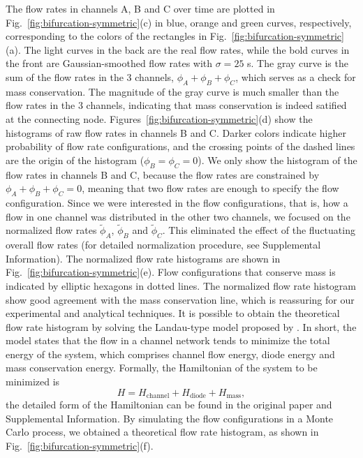 \documentclass[%
10pt,
superscriptaddress,
twocolumn,
 amsmath,amssymb,
 aps,prx,
]{revtex4-2}
\begin{document}
The flow rates in channels A, B and C over time are plotted in Fig.~\ref{fig:bifurcation-symmetric}(c) in blue, orange and green curves, respectively, corresponding to the colors of the rectangles in Fig.~\ref{fig:bifurcation-symmetric}(a).
The light curves in the back are the real flow rates, while the bold curves in the front are Gaussian-smoothed flow rates with $\sigma=25$ s.
The gray curve is the sum of the flow rates in the 3 channels, $\phi_A+\phi_B+\phi_C$, which serves as a check for mass conservation.
The magnitude of the gray curve is much smaller than the flow rates in the 3 channels, indicating that mass conservation is indeed satified at the connecting node.
Figures~\ref{fig:bifurcation-symmetric}(d) show the histograms of raw flow rates in channels B and C.
Darker colors indicate higher probability of flow rate configurations, and the crossing points of the dashed lines are the origin of the histogram ($\phi_B=\phi_C=0$).
We only show the histogram of the flow rates in channels B and C, because the flow rates are constrained by $\phi_A+\phi_B+\phi_C=0$, meaning that two flow rates are enough to specify the flow configuration.
Since we were interested in the flow configurations, that is, how a flow in one channel was distributed in the other two channels, we focused on the normalized flow rates $\tilde\phi_A$, $\tilde\phi_B$ and $\tilde\phi_C$.
This eliminated the effect of the fluctuating overall flow rates (for detailed normalization procedure, see Supplemental Information).
The normalized flow rate histograms are shown in Fig.~\ref{fig:bifurcation-symmetric}(e).
Flow configurations that conserve mass is indicated by elliptic hexagons in dotted lines.
The normalized flow rate histogram show good agreement with the mass conservation line, which is reassuring for our experimental and analytical techniques.
It is possible to obtain the theoretical flow rate histogram by solving the Landau-type model proposed by \citet{Woodhouse2017}.
In short, the model states that the flow in a channel network tends to minimize the total energy of the system, which comprises channel flow energy, diode energy and mass conservation energy.
Formally, the Hamiltonian of the system to be minimized is
%
\begin{equation}
    H = H_{\mathrm{channel}} + H_{\mathrm{diode}} + H_{\mathrm{mass}},
\end{equation}
%
the detailed form of the Hamiltonian can be found in the original paper \cite{Woodhouse2017} and Supplemental Information.
By simulating the flow configurations in a Monte Carlo process, we obtained a theoretical flow rate histogram, as shown in Fig.~\ref{fig:bifurcation-symmetric}(f).
\end{document}
